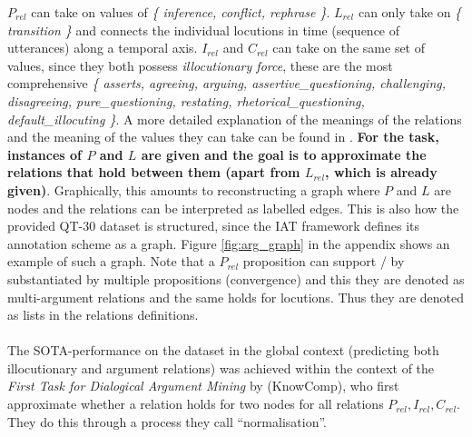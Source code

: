 \documentclass[11pt]{article}
\begin{document}
$P_{rel}$ can take on values of \textit{\{ inference, conflict, rephrase \}}. $L_{rel}$ can only take on \textit{\{ transition \}} and connects the individual locutions in time (sequence of utterances) along a temporal axis. $I_{rel}$ and $C_{rel}$ can take on the same set of values, since they both possess \textit{illocutionary force}, these are the most comprehensive \textit{\{ asserts, agreeing, arguing, assertive\_questioning, challenging, disagreeing, pure\_questioning, restating, rhetorical\_questioning, default\_illocuting \}}. A more detailed explanation of the meanings of the relations and the meaning of the values they can take can be found in \citet[p. 3294]{hautli-janisz_qt30_2022}. \textbf{For the task, instances of $P$ and $L$ are given and the goal is to approximate the relations that hold between them (apart from $L_{rel}$, which is already given)}. Graphically, this amounts to reconstructing a graph where $P$ and $L$ are nodes and the relations can be interpreted as labelled edges. This is also how the provided QT-30 dataset is structured, since the IAT framework defines its annotation scheme as a graph. Figure \ref{fig:arg_graph} in the appendix shows an example of such a graph. Note that a $P_{rel}$ proposition can support / by substantiated by multiple propositions (convergence) and this they are denoted as multi-argument relations and the same holds for locutions. Thus they are denoted as lists in the relations definitions. \\
\\
The SOTA-performance on the dataset in the global context (predicting both illocutionary and argument relations) was achieved within the context of the \textit{First Task for Dialogical Argument Mining} \citep{ruiz-dolz_overview_2024} by \citet{binder_dfki-mlst_2024} (KnowComp), who first approximate whether a relation holds for two nodes for all relations $P_{rel}, I_{rel}, C_{rel}$. They do this through a process they call ``normalisation''.

\end{document}
